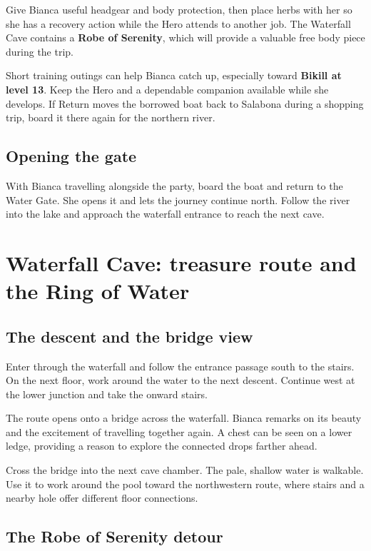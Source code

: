 Give Bianca useful headgear and body protection, then place herbs
with her so she has a recovery action while the Hero attends to another
job. The Waterfall Cave contains a \textbf{Robe of Serenity}, which
will provide a valuable free body piece during the trip.

Short training outings can help Bianca catch up, especially toward
\textbf{Bikill at level 13}. Keep the Hero and a dependable companion
available while she develops. If Return moves the borrowed boat back
to Salabona during a shopping trip, board it there again for the
northern river.

\subsection*{Opening the gate}

With Bianca travelling alongside the party, board the boat and return
to the Water Gate. She opens it and lets the journey continue north.
Follow the river into the lake and approach the waterfall entrance
to reach the next cave.

\section{Waterfall Cave: treasure route and the Ring of Water}

\subsection*{The descent and the bridge view}

Enter through the waterfall and follow the entrance passage south
to the stairs. On the next floor, work around the water to the next
descent. Continue west at the lower junction and take the onward stairs.

The route opens onto a bridge across the waterfall. Bianca remarks
on its beauty and the excitement of travelling together again. A
chest can be seen on a lower ledge, providing a reason to explore
the connected drops farther ahead.

Cross the bridge into the next cave chamber. The pale, shallow water
is walkable. Use it to work around the pool toward the northwestern
route, where stairs and a nearby hole offer different floor connections.

\subsection*{The Robe of Serenity detour}

